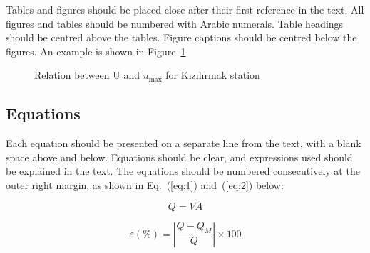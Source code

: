 \documentclass[a4paper,12pt]{article}
\begin{document}
Tables and figures should be placed close after their first reference in the
text. All figures and tables should be numbered with Arabic numerals. Table
headings should be centred above the tables. Figure captions should be centred
below the figures. An example is shown in Figure~\ref{fig:example}.

\begin{figure}[H]
  \centering
  \caption{Relation between U and $u_{\max}$ for K{\i}z{\i}l{\i}rmak station}
  \label{fig:example}
\end{figure}

\subsection{Equations}
Each equation should be presented on a separate line from the text, with a
blank space above and below. Equations should be clear, and expressions used
should be explained in the text. The equations should be numbered consecutively
at the outer right margin, as shown in Eq.~(\ref{eq:1}) and~(\ref{eq:2}) below:

\begin{equation}
  Q = VA
  \label{eq:1}
\end{equation}

\begin{equation}
  \varepsilon(\%) = \left| \frac{Q - Q_{M}}{Q} \right| \times 100
  \label{eq:2}
\end{equation}
\end{document}
